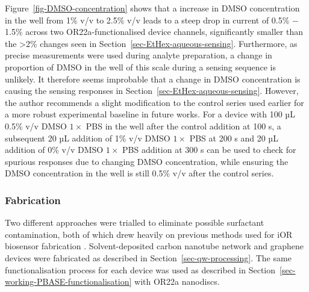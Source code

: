 \documentclass[
  a4paper,
]{scrbook}
\begin{document}
Figure~\ref{fig-DMSO-concentration} shows that a increase in DMSO
concentration in the well from 1\% v/v to 2.5\% v/v leads to a steep
drop in current of 0.5\% \(-\) 1.5\% across two OR22a-functionalised
device channels, significantly smaller than the \textgreater2\% changes
seen in Section~\ref{sec-EtHex-aqueous-sensing}. Furthermore, as precise
measurements were used during analyte preparation, a change in
proportion of DMSO in the well of this scale during a sensing sequence
is unlikely. It therefore seems improbable that a change in DMSO
concentration is causing the sensing responses in
Section~\ref{sec-EtHex-aqueous-sensing}. However, the author recommends
a slight modification to the control series used earlier for a more
robust experimental baseline in future works. For a device with 100 µL
0.5\% v/v DMSO \(1 \times\) PBS in the well after the control addition
at 100 s, a subsequent 20 µL addition of 1\% v/v DMSO \(1 \times\) PBS
at 200 s and 20 µL addition of 0\% v/v DMSO \(1 \times\) PBS addition at
300 s can be used to check for spurious responses due to changing DMSO
concentration, while ensuring the DMSO concentration in the well is
still 0.5\% v/v after the control series.

\hypertarget{fabrication}{%
\subsubsection*{Fabrication}\label{fabrication}}

Two different approaches were trialled to eliminate possible surfactant
contamination, both of which drew heavily on previous methods used for
iOR biosensor fabrication \autocite{Murugathas2019a,Murugathas2020}.
Solvent-deposited carbon nanotube network and graphene devices were
fabricated as described in Section~\ref{sec-qw-processing}. The same
functionalisation process for each device was used as described in
Section~\ref{sec-working-PBASE-functionalisation} with OR22a nanodiscs.
\end{document}
